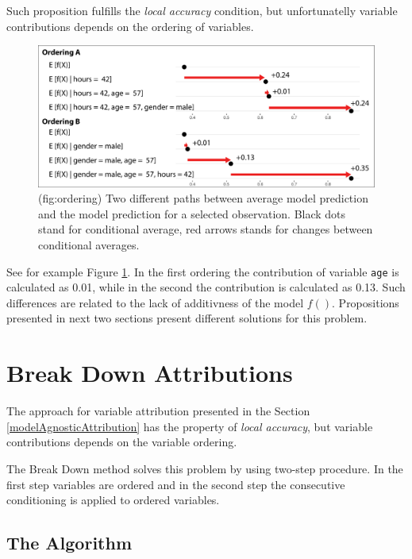 \documentclass[]{book}
\theoremstyle{definition}
\theoremstyle{definition}
\theoremstyle{definition}
\theoremstyle{remark}
\begin{document}
Such proposition fulfills the \emph{local accuracy} condition, but
unfortunatelly variable contributions depends on the ordering of
variables.

\begin{figure}

{\centering \includegraphics[width=1\linewidth]{figure/ordering} 

}

\caption{(fig:ordering) Two different paths between average model prediction and the model prediction for a selected observation. Black dots stand for conditional average, red arrows stands for changes between conditional averages.}\label{fig:ordering}
\end{figure}

See for example Figure \ref{fig:ordering}. In the first ordering the
contribution of variable \texttt{age} is calculated as 0.01, while in
the second the contribution is calculated as 0.13. Such differences are
related to the lack of additivness of the model \(f()\). Propositions
presented in next two sections present different solutions for this
problem.

\hypertarget{breakDown}{%
\chapter{Break Down Attributions}\label{breakDown}}

The approach for variable attribution presented in the Section
\ref{modelAgnosticAttribution} has the property of \emph{local
accuracy}, but variable contributions depends on the variable ordering.

The Break Down method solves this problem by using two-step procedure.
In the first step variables are ordered and in the second step the
consecutive conditioning is applied to ordered variables.

\hypertarget{the-algorithm}{%
\section{The Algorithm}\label{the-algorithm}}
\end{document}
